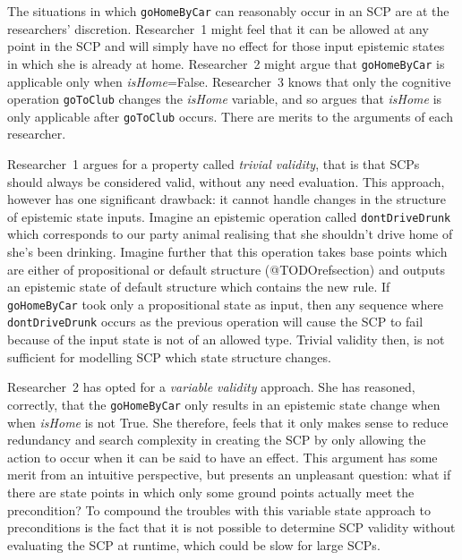 \documentclass[
11pt, %
english, %
singlespacing, %
headsepline, %
]{MastersDoctoralThesis} %
\begin{document}
The situations in which \texttt{goHomeByCar} can reasonably occur in an SCP are at the researchers' discretion. Researcher~1 might feel that it can be allowed at any point in the SCP and will simply have no effect for those input epistemic states in which she is already at home. Researcher~2 might argue that \texttt{goHomeByCar} is applicable only when \textit{isHome}=False. Researcher~3 knows that only the cognitive operation \texttt{goToClub} changes the \textit{isHome} variable, and so argues that \textit{isHome} is only applicable after \texttt{goToClub} occurs. There are merits to the arguments of each researcher.

Researcher~1 argues for a property called \textit{trivial validity}, that is that SCPs should always be considered valid, without any need evaluation. This approach, however has one significant drawback: it cannot handle changes in the structure of epistemic state inputs. Imagine an epistemic operation called \texttt{dontDriveDrunk} which corresponds to our party animal realising that she shouldn't drive home of she's been drinking. Imagine further that this operation takes base points which are either of propositional or default structure (@TODOrefsection) and outputs an epistemic state of default structure which contains the new rule. If \texttt{goHomeByCar} took only a propositional state as input, then any sequence where \texttt{dontDriveDrunk} occurs as the previous operation will cause the SCP to fail because of the input state is not of an allowed type. Trivial validity then, is not sufficient for modelling SCP which state structure changes.

Researcher~2 has opted for a \textit{variable validity} approach. She has reasoned, correctly, that the \texttt{goHomeByCar} only results in an epistemic state change when when \textit{isHome} is not True. She therefore, feels that it only makes sense to reduce redundancy and search complexity in creating the SCP by only allowing the action to occur when it can be said to have an effect. This argument has some merit from an intuitive perspective, but presents an unpleasant question: what if there are state points in which only some ground points actually meet the precondition? To compound the troubles with this variable state approach to preconditions is the fact that it is not possible to determine SCP validity without evaluating the SCP at runtime, which could be slow for large SCPs.
\end{document}
